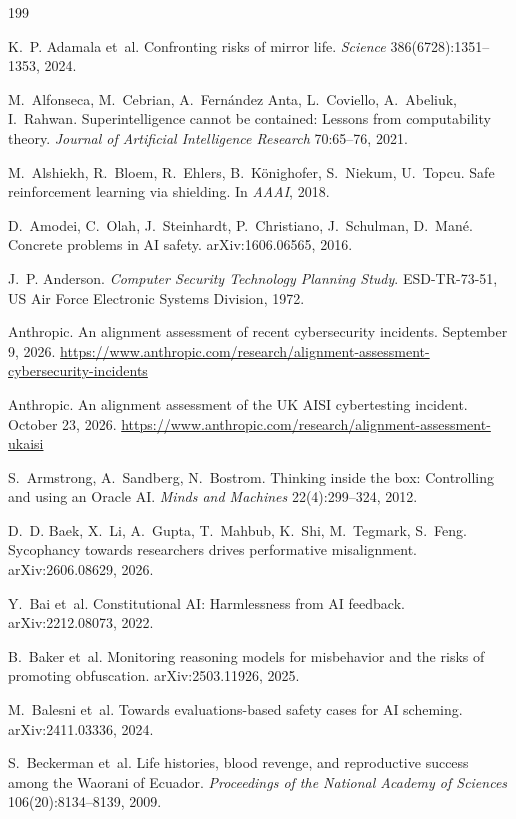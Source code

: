 \documentclass[10pt,twocolumn,letterpaper]{article}
\theoremstyle{definition}
\begin{document}
\begingroup
\footnotesize
\begin{thebibliography}{199}

 K.~P. Adamala et~al. Confronting risks of mirror life. \emph{Science} 386(6728):1351--1353, 2024.

 M.~Alfonseca, M.~Cebrian, A.~Fern\'andez Anta, L.~Coviello, A.~Abeliuk, I.~Rahwan. Superintelligence cannot be contained: Lessons from computability theory. \emph{Journal of Artificial Intelligence Research} 70:65--76, 2021.

 M.~Alshiekh, R.~Bloem, R.~Ehlers, B.~K\"onighofer, S.~Niekum, U.~Topcu. Safe reinforcement learning via shielding. In \emph{AAAI}, 2018.

 D.~Amodei, C.~Olah, J.~Steinhardt, P.~Christiano, J.~Schulman, D.~Man\'e. Concrete problems in AI safety. arXiv:1606.06565, 2016.

 J.~P. Anderson. \emph{Computer Security Technology Planning Study}. ESD-TR-73-51, US Air Force Electronic Systems Division, 1972.

 Anthropic. An alignment assessment of recent cybersecurity incidents. September 9, 2026. \url{https://www.anthropic.com/research/alignment-assessment-cybersecurity-incidents}

 Anthropic. An alignment assessment of the UK AISI cybertesting incident. October 23, 2026. \url{https://www.anthropic.com/research/alignment-assessment-ukaisi}

 S.~Armstrong, A.~Sandberg, N.~Bostrom. Thinking inside the box: Controlling and using an Oracle AI. \emph{Minds and Machines} 22(4):299--324, 2012.

 D.~D. Baek, X.~Li, A.~Gupta, T.~Mahbub, K.~Shi, M.~Tegmark, S.~Feng. Sycophancy towards researchers drives performative misalignment. arXiv:2606.08629, 2026.

 Y.~Bai et~al. Constitutional AI: Harmlessness from AI feedback. arXiv:2212.08073, 2022.

 B.~Baker et~al. Monitoring reasoning models for misbehavior and the risks of promoting obfuscation. arXiv:2503.11926, 2025.

 M.~Balesni et~al. Towards evaluations-based safety cases for AI scheming. arXiv:2411.03336, 2024.

 S.~Beckerman et~al. Life histories, blood revenge, and reproductive success among the Waorani of Ecuador. \emph{Proceedings of the National Academy of Sciences} 106(20):8134--8139, 2009.


\end{thebibliography}
\end{document}
